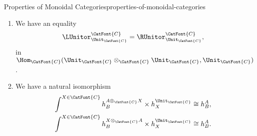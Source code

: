 \begin{proposition}{Properties of Monoidal Categories}{properties-of-monoidal-categories}
\begin{enumerate}
\[\begin{tikzcd}[row sep={7.0*\the\DL,between origins}, column sep={6.0*\the\DL,between origins}, background color=backgroundColor, ampersand replacement=\&]
                    \arrow[rd, "\RUnitor^{\CatFont{C}}_{A\otimes_{\CatFont{C}}B}"']
                    \&\&
                    A\otimes_{\CatFont{C}}(B\otimes_{\CatFont{C}}\Unit_{\CatFont{C}})
                    \arrow[ld, "\id_{A}\otimes_{\CatFont{C}}\RUnitor^{\CatFont{C}}_{B}"]
                    \\\&
                    A\otimes_{\CatFont{C}}B
                    \&
                \end{tikzcd}
            \]%
        \item\label{properties-of-monoidal-categories-coherence-for-left-and-right-unitors-of-the-monoidal-unit}We have an equality
            \[
                \LUnitor^{\CatFont{C}}_{\Unit_{\CatFont{C}}}
                =
                \RUnitor^{\CatFont{C}}_{\Unit_{\CatFont{C}}},
            \]
            in $\Hom_{\CatFont{C}}(\Unit_{\CatFont{C}}\otimes_{\CatFont{C}}\Unit_{\CatFont{C}},\Unit_{\CatFont{C}})$.
        \item\label{properties-of-monoidal-categories-the-yoneda-lemma-for-co-ends-for-monoidal-categories}We have a natural isomorphism
            \begin{align*}
                \int^{X\in\CatFont{C}}h^{A\otimes_{\CatFont{C}}X}_{B}\times h^{\Unit_{\CatFont{C}}}_{X} &\cong h^{A}_{B},\\
                \int^{X\in\CatFont{C}}h^{X\otimes_{\CatFont{C}}A}_{B}\times h^{\Unit_{\CatFont{C}}}_{X} &\cong h^{A}_{B}.
            \end{align*}
    \end{enumerate}
\end{proposition}
